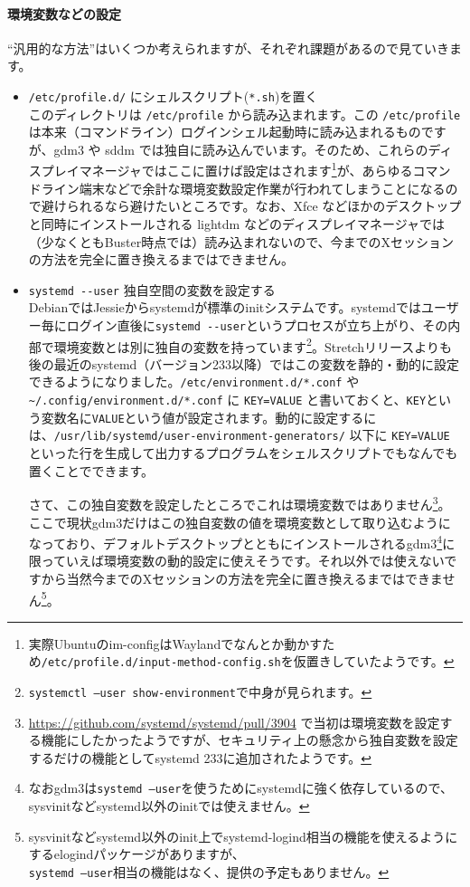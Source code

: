 \documentclass[mingoth,a4paper]{jsarticle}
\begin{document}
\paragraph{環境変数などの設定}
``汎用的な方法''はいくつか考えられますが、それぞれ課題があるので見ていきます。

\begin{itemize}
 \item \verb|/etc/profile.d/| にシェルスクリプト(\verb|*.sh|)を置く\\
このディレクトリは \verb|/etc/profile| から読み込まれます。この \verb|/etc/profile| は本来（コマンドライン）ログインシェル起動時に読み込まれるものですが、gdm3 や sddm では独自に読み込んでいます。そのため、これらのディスプレイマネージャではここに置けば設定はされます\footnote{実際Ubuntuのim-configはWaylandでなんとか動かすため\texttt{/etc/profile.d/input-method-config.sh}を仮置きしていたようです。}が、あらゆるコマンドライン端末などで余計な環境変数設定作業が行われてしまうことになるので避けられるなら避けたいところです。なお、Xfce などほかのデスクトップと同時にインストールされる lightdm などのディスプレイマネージャでは（少なくともBuster時点では）読み込まれないので、今までのXセッションの方法を完全に置き換えるまではできません。
 \item \verb|systemd --user| 独自空間の変数を設定する\\
DebianではJessieからsystemdが標準のinitシステムです。systemdではユーザー毎にログイン直後に\verb|systemd --user|というプロセスが立ち上がり、その内部で環境変数とは別に独自の変数を持っています\footnote{\texttt{systemctl --user show-environment}で中身が見られます。}。Stretchリリースよりも後の最近のsystemd（バージョン233以降）ではこの変数を静的・動的に設定できるようになりました。\verb|/etc/environment.d/*.conf| や \verb|~/.config/environment.d/*.conf| に \verb|KEY=VALUE| と書いておくと、\verb|KEY|という変数名に\verb|VALUE|という値が設定されます。動的に設定するには、\verb|/usr/lib/systemd/user-environment-generators/| 以下に \verb|KEY=VALUE| といった行を生成して出力するプログラムをシェルスクリプトでもなんでも置くことでできます。

さて、この独自変数を設定したところでこれは環境変数ではありません\footnote{\url{https://github.com/systemd/systemd/pull/3904} で当初は環境変数を設定する機能にしたかったようですが、セキュリティ上の懸念から独自変数を設定するだけの機能としてsystemd 233に追加されたようです。}。ここで現状gdm3だけはこの独自変数の値を環境変数として取り込むようになっており、デフォルトデスクトップとともにインストールされるgdm3\footnote{なおgdm3は\texttt{systemd --user}を使うためにsystemdに強く依存しているので、sysvinitなどsystemd以外のinitでは使えません。}に限っていえば環境変数の動的設定に使えそうです。それ以外では使えないですから当然今までのXセッションの方法を完全に置き換えるまではできません\footnote{sysvinitなどsystemd以外のinit上でsystemd-logind相当の機能を使えるようにするelogindパッケージがありますが、\\
\texttt{systemd --user}相当の機能はなく、提供の予定もありません。}。


\end{itemize}
\end{document}
